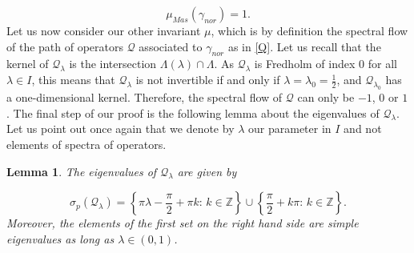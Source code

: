 \documentclass[a4paper,10pt]{article}
\newtheorem{lemma}[theorem]{Lemma}
\begin{document}
\[\mu_{Mas}(\gamma_{nor})=1.\]
Let us now consider our other invariant $\mu$, which is by definition the spectral flow of the path of operators $\mathcal{Q}$ associated to $\gamma_{nor}$ as in \eqref{Q}. Let us recall that the kernel of $\mathcal{Q}_\lambda$ is the intersection $\Lambda(\lambda)\cap\Lambda$. As $\mathcal{Q}_\lambda$ is Fredholm of index $0$ for all $\lambda\in I$, this means that $\mathcal{Q}_{\lambda}$ is not invertible if and only if $\lambda=\lambda_0=\frac{1}{2}$, and $\mathcal{Q}_{\lambda_0}$ has a one-dimensional kernel. Therefore, the spectral flow of $\mathcal{Q}$ can only be $-1$, $0$ or $1$. The final step of our proof is the following lemma about the eigenvalues of $\mathcal{Q}_\lambda$. Let us point out once again that we denote by $\lambda$ our parameter in $I$ and not elements of spectra of operators.

\begin{lemma}\label{eigenvaluesQ}
The eigenvalues of $\mathcal{Q}_\lambda$ are given by

\[\sigma_p(\mathcal{Q}_\lambda)=\left\{\pi \lambda-\frac{\pi}{2}+\pi k:\,k\in\mathbb{Z}\right\}\cup\left\{\frac{\pi}{2}+k\pi:\, k\in\mathbb{Z}\right\}.\]
Moreover, the elements of the first set on the right hand side are simple eigenvalues as long as $\lambda\in(0,1)$.
\end{lemma} 
\end{document}
